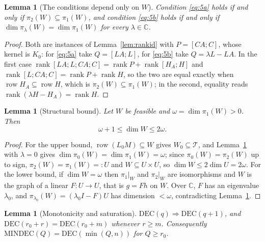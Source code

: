\documentclass[journal]{IEEEtran}
\theoremstyle{plainn}
\newtheorem{lem}[thm]{Lemma}
\theoremstyle{remark}
\begin{document}
\begin{lem}[The conditions depend only on $W$]\label{lem:W-conditions}
Condition \eqref{eq:5a} holds if and only if $\pi_2(W)\subseteq\pi_1(W)$, and condition
\eqref{eq:5b} holds if and only if $\dim\pi_\lambda(W)=\dim\pi_1(W)$ for every
$\lambda\in\mathbb C$.
\end{lem}

\begin{proof}
Both are instances of Lemma~\ref{lem:rankid} with $P=[CA;C]$, whose kernel is $K_0$: for
\eqref{eq:5a} take $Q=[LA;L]$, for \eqref{eq:5b} take $Q=\lambda L-LA$. In the first case
$\operatorname{rank}[LA;L;CA;C]=\operatorname{rank}P+\operatorname{rank}[H_A;H]$ and
$\operatorname{rank}[L;CA;C]=\operatorname{rank}P+\operatorname{rank}H$, so the two are equal
exactly when $\operatorname{row}H_A\subseteq\operatorname{row}H$, which is
$\pi_2(W)\subseteq\pi_1(W)$; in the second, equality reads
$\operatorname{rank}(\lambda H-H_A)=\operatorname{rank}H$.
\end{proof}

\begin{lem}[Structural bound]\label{lem:struct}
Let $W$ be feasible and $\omega=\dim\pi_1(W)>0$. Then
\begin{equation}\label{eq:struct}
\omega+1\le\dim W\le2\omega .
\end{equation}
\end{lem}

\begin{proof}
For the upper bound, $\operatorname{row}(L_0M)\subseteq W$ gives
$W_0\subseteq\mathcal T$, and Lemma~\ref{lem:W-conditions} with $\lambda=0$ gives
$\dim\pi_0(W)=\dim\pi_1(W)=\omega$; since $\pi_0(W)=\pi_2(W)$ up to sign,
$\pi_2(W)=\pi_1(W)=:U$ and $W\subseteq U\times U$, so $\dim W\le2\dim U=2\omega$. For the
lower bound, if $\dim W=\omega$ then $\pi_1|_W$ and $\pi_2|_W$ are isomorphisms and $W$ is the
graph of a linear $F:U\to U$, that is $g=Fh$ on $W$. Over $\mathbb C$, $F$ has an eigenvalue
$\lambda_0$, and $\pi_{\lambda_0}(W)=(\lambda_0I-F)U$ has dimension $<\omega$, contradicting
Lemma~\ref{lem:W-conditions}.
\end{proof}

\begin{lem}[Monotonicity and saturation]\label{lem:monotone}
$\mathrm{DEC}(q)\Rightarrow\mathrm{DEC}(q+1)$, and $\mathrm{DEC}(r_0+r)=\mathrm{DEC}(r_0+m)$
whenever $r\ge m$. Consequently $\mathrm{MINDEC}(Q)=\mathrm{DEC}(\min(Q,n))$ for
$Q\ge r_0$.
\end{lem}
\end{document}
